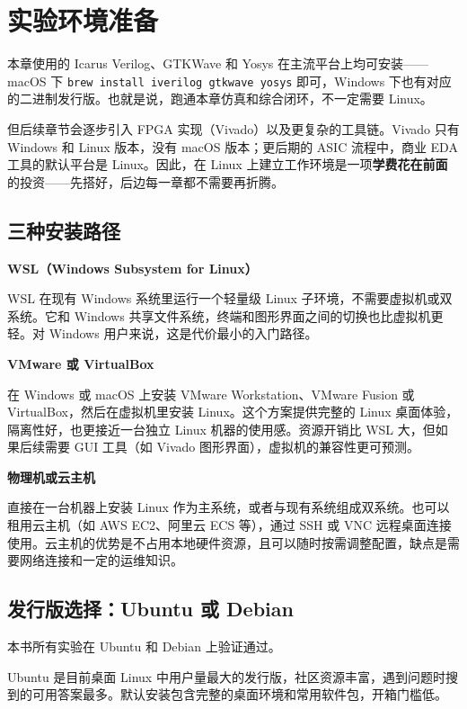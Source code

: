 \documentclass[11pt,a4paper]{article}
\begin{document}
\section{实验环境准备}

本章使用的 Icarus Verilog、GTKWave 和 Yosys 在主流平台上均可安装——macOS 下 \texttt{brew install iverilog gtkwave yosys} 即可，Windows 下也有对应的二进制发行版。也就是说，跑通本章仿真和综合闭环，不一定需要 Linux。

但后续章节会逐步引入 FPGA 实现（Vivado）以及更复杂的工具链。Vivado 只有 Windows 和 Linux 版本，没有 macOS 版本；更后期的 ASIC 流程中，商业 EDA 工具的默认平台是 Linux。因此，在 Linux 上建立工作环境是一项\textbf{学费花在前面}的投资——先搭好，后边每一章都不需要再折腾。

\subsection{三种安装路径}

\textbf{WSL（Windows Subsystem for Linux）}

WSL 在现有 Windows 系统里运行一个轻量级 Linux 子环境，不需要虚拟机或双系统。它和 Windows 共享文件系统，终端和图形界面之间的切换也比虚拟机更轻。对 Windows 用户来说，这是代价最小的入门路径。

\textbf{VMware 或 VirtualBox}

在 Windows 或 macOS 上安装 VMware Workstation、VMware Fusion 或 VirtualBox，然后在虚拟机里安装 Linux。这个方案提供完整的 Linux 桌面体验，隔离性好，也更接近一台独立 Linux 机器的使用感。资源开销比 WSL 大，但如果后续需要 GUI 工具（如 Vivado 图形界面），虚拟机的兼容性更可预测。

\textbf{物理机或云主机}

直接在一台机器上安装 Linux 作为主系统，或者与现有系统组成双系统。也可以租用云主机（如 AWS EC2、阿里云 ECS 等），通过 SSH 或 VNC 远程桌面连接使用。云主机的优势是不占用本地硬件资源，且可以随时按需调整配置，缺点是需要网络连接和一定的运维知识。

\subsection{发行版选择：Ubuntu 或 Debian}

本书所有实验在 Ubuntu 和 Debian 上验证通过。

Ubuntu 是目前桌面 Linux 中用户量最大的发行版，社区资源丰富，遇到问题时搜到的可用答案最多。默认安装包含完整的桌面环境和常用软件包，开箱门槛低。
\end{document}
